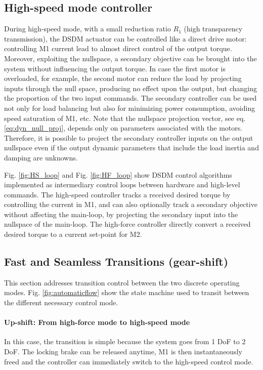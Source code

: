 \subsection{High-speed mode controller}

During high-speed mode, with a small reduction ratio $R_1$ (high transparency transmission), the DSDM actuator can be controlled like a direct drive motor: controlling M1 current lead to almost direct control of the output torque. Moreover, exploiting the nullspace, a secondary objective can be brought into the system without influencing the output torque. In case the first motor is overloaded, for example, the second motor can reduce the load by projecting inputs through the null space, producing no effect upon the output, but changing the proportion of the two input commands. The secondary controller can be used not only for load balancing but also for minimizing power consumption, avoiding speed saturation of M1, etc. Note that the nullspace projection vector, see eq.\eqref{eq:dyn_null_proj}, depends only on parameters associated with the motors. Therefore, it is possible to project the secondary controller inputs on the output nullspace even if the output dynamic parameters that include the load inertia and damping are unknowns. 

Fig. \ref{fig:HS_loop} and Fig. \ref{fig:HF_loop} show DSDM control algorithms implemented as intermediary control loops between hardware and high-level commands. The high-speed controller tracks a received desired torque by controlling the current in M1, and can also optionally track a secondary objective without affecting the main-loop, by projecting the secondary input into the nullspace of the main-loop. The high-force controller directly convert a received desired torque to a current set-point for M2.


\subsection{Fast and Seamless Transitions (gear-shift)}

This section addresses transition control between the two discrete operating modes. Fig. \ref{fig:automaticflow} show the state machine used to transit between the different necessary control mode.


\paragraph{Up-shift: From high-force mode to high-speed mode}
In this case, the transition is simple because the system goes from 1 DoF to 2 DoF. The locking brake can be released anytime, M1 is then instantaneously freed and the controller can immediately switch to the high-speed control mode.
%

